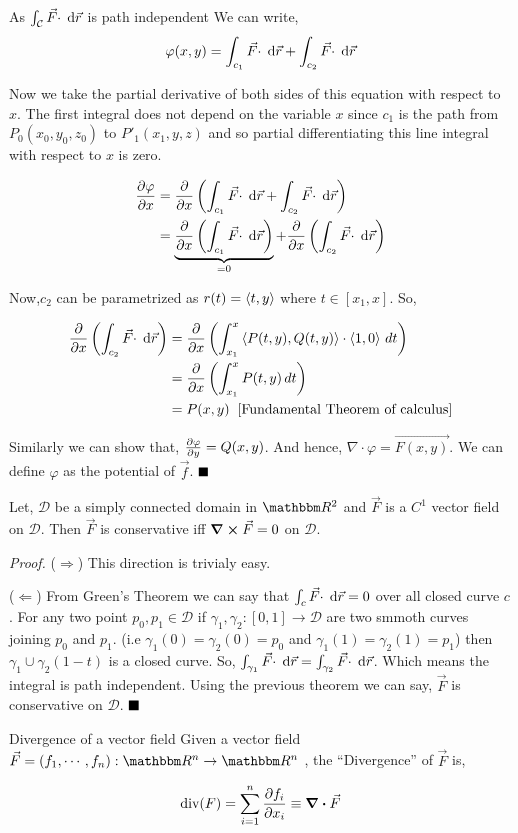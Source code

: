 \documentclass[Analysis-3]{subfiles}
\begin{document}
As $\int_{\mathcal{C}} {\vec{F} \cdot } \hspace{0.1cm} \dd {\vec{r}}$ is path independent We can write, \[
    \varphi(x,y) = \int_{c_1} {\vec{F} \cdot } \hspace{0.1cm} \dd {\vec{r}} + \int_{c_2} {\vec{F} \cdot } \hspace{0.1cm} \dd {\vec{r}}
\]

Now we take the partial derivative of both sides of this equation with respect to $x$. The first integral does not depend on the variable $x$ since $c_1$ is the path from $P_0(x_0,y_0,z_0)$ to $P'_1(x_1,y,z)$ and so partial differentiating this line integral with respect to $x$ is zero.

\begin{align*}
    \pdv{\varphi}{x} &=\pdv{x} \left( \int_{c_1} {\vec{F} \cdot } \hspace{0.1cm} \dd {\vec{r}} + \int_{c_2} {\vec{F} \cdot } \hspace{0.1cm} \dd {\vec{r}} \right)  \\
    &= \underbrace{\pdv{x} \left( \int_{c_1} {\vec{F} \cdot } \hspace{0.1cm} \dd {\vec{r}}\right)}_{= 0}  + \pdv{x} \left(\int_{c_2} {\vec{F} \cdot } \hspace{0.1cm} \dd {\vec{r}} \right) 
\end{align*}

Now,$c_2$ can be parametrized as $r(t) = \left\langle {t}, {y} \right\rangle$ where $t \in [x_1,x]$. So,

\begin{align*}
    \pdv{x} \left(\int_{c_2} {\vec{F} \cdot } \hspace{0.1cm} \dd {\vec{r}}\right) &= \pdv{x} \left( \int_{x_1}^x \left\langle {P(t,y)}, {Q(t,y)} \right\rangle \cdot \left\langle {1}, {0} \right\rangle \,d t \right) \\ 
    &= \pdv{x} \left( \int_{x_1}^x P(t,y) \,d t \right) \\
    &= P(x,y) \hspace{0.2cm} \text{[Fundamental Theorem of calculus]}
\end{align*}

Similarly we can show that, $\pdv{\varphi}{y} = Q(x,y)$. And hence,  $ \nabla \cdot \varphi = \vec{F(x,y)}$. We can define $\varphi$ as the potential of $\vec{f}$. $\hfill \blacksquare$

\begin{Thm}{}{}
    Let, $\mathcal{D}$ be a simply connected domain in $\R^2$ and $\vec{F}$ is a $C^1$ vector field on $\mathcal{D}$. Then $\vec{F}$ is conservative iff $\curl \vec{F} = 0$ on $\mathcal{D}$.
\end{Thm}

\textit{Proof.} ($\Rightarrow$) This direction is trivialy easy.

\vspace{0.2cm}

($\Leftarrow$) From Green's Theorem we can say that $ \int_{c} {\vec{F} \cdot } \hspace{0.1cm} \dd {\vec{r}} = 0$ over all closed curve $c$. For any two point $p_0,p_1 \in \mathcal{D}$ if $\gamma_1, \gamma_2 : [0,1] \to \mathcal{D}$ are two smmoth curves joining $p_0$ and $p_1$. (i.e $\gamma_1(0) = \gamma_2 (0) = p_0$ and $\gamma_1(1) = \gamma_2(1) = p_1$) then $\gamma_1 \cup \gamma_2(1-t)$ is a closed curve. So, $ \int_{\gamma_1} {\vec{F} \cdot } \hspace{0.1cm} \dd {\vec{r}}  = \int_{\gamma_2} {\vec{F} \cdot } \hspace{0.1cm} \dd {\vec{r}}$. Which means the integral is path independent. Using the previous theorem we can say, $\vec{F}$ is conservative on $\mathcal{D}$. $\hfill \blacksquare$

\begin{Def}{Divergence of a vector field}{}
    Given a vector field $\vec{F} = (f_1,\cdots, f_n) : \R^n \to \R^n $ , the ``Divergence'' of $\vec{F}$ is,

    \[\text{div}(F) = \sum_{i=1}^{n} \pdv{f_i}{x_i} \equiv \div \vec{F}\]
\end{Def}
\end{document}
